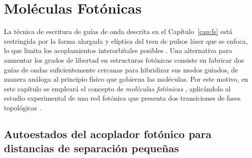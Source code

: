 \chapter{Moléculas Fotónicas \label{cap:molecules}}

La técnica de escritura de guías de onda descrita en el Capítulo~\ref{cap:fs} está restringida por la forma alargada y elíptica del tren de pulsos láser que se enfoca, lo que limita los acoplamientos interorbitales posibles \citep{interorbital}. Una alternativa para aumentar los grados de libertad en estructuras fotónicas consiste en fabricar dos guías de ondas suficientemente cercanas para hibridizar sus modos guiados, de manera análoga al principio físico que gobierna las moléculas. Por este motivo, en este capítulo se empleará el concepto de \textit{moléculas fotónicas} \citep{molecules}, aplicándolo al estudio experimental de una red fotónica que presenta dos transiciones de fases topológicas \citep{SPSSH}.

\section{Autoestados del acoplador fotónico para distancias de separación pequeñas}

